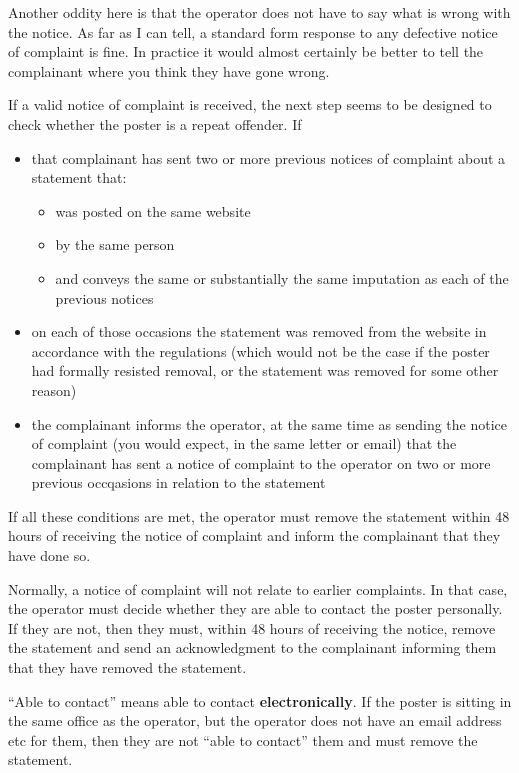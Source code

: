 \documentclass[]{article}
\begin{document}
Another oddity here is that the operator does not have to say what is wrong with the notice. As far as I can tell, a standard form response to any defective notice of complaint is fine. In practice it would almost certainly be better to tell the complainant where you think they have gone wrong.

If a valid notice of complaint is received, the next step seems to be designed to check whether the poster is a repeat offender. If

\begin{itemize}
\item that complainant has sent two or more previous notices of complaint about a statement that:
  \begin{itemize}
  \item was posted on the same website
  \item by the same person
  \item and conveys the same or substantially the same imputation as each of the previous notices
  \end{itemize}
\item on each of those occasions the statement was removed from the website in accordance with the regulations (which would not be the case if the poster had formally resisted removal, or the statement was removed for some other reason)
\item the complainant informs the operator, at the same time as sending the notice of complaint (you would expect, in the same letter or email) that the complainant has sent a notice of complaint to the operator on two or more previous occqasions in relation to the statement
\end{itemize}

If all these conditions are met, the operator must remove the statement within 48 hours of receiving the notice of complaint and inform the complainant that they have done so.

Normally, a notice of complaint will not relate to earlier complaints. In that case, the operator must decide whether they are able to contact the poster personally. If they are not, then they must, within 48 hours of receiving the notice, remove the statement and send an acknowledgment to the complainant informing them that they have removed the statement.

``Able to contact'' means able to contact {\bf electronically}. If the poster is sitting in the same office as the operator, but the operator does not have an email address etc for them, then they are not ``able to contact'' them and must remove the statement.
\end{document}

